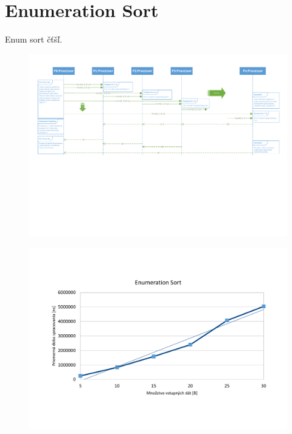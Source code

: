 \documentclass[a4paper,11pt]{article}
\begin{document}
\section{Enumeration Sort}
Enum sort čťšľ.

\begin{figure}[!htb]
\centering
\includegraphics[width=\textwidth]{sequence.pdf}
\end{figure}

\begin{figure}[!htb]
\centering
\includegraphics[width=\textwidth]{stats.pdf}
\end{figure}
\end{document}
